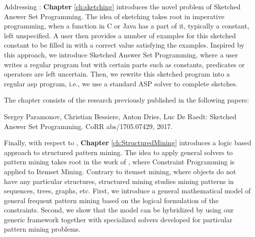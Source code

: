 Addressing \cthree:  \textbf{Chapter} \ref{ch:sketching} introduces the novel problem of
Sketched Answer Set Programming. The idea of sketching takes root in
imperative programming, when a function in C or Java has a part of it,
typically a constant, left unspecified. A user then provides a number
of examples for this sketched constant to be filled in with a
correct value satisfying the examples. Inspired by this approach, we
introduce Sketched Answer Set Programming, where a user writes a
regular program but with certain parts such as constants, predicates
or operators are left uncertain. Then, we rewrite this sketched
program into a regular \acrlong{asp} program, i.e., we use a standard ASP solver
to complete sketches.


The chapter consists of the research previously published in the following papers:
\begin{addmargin}[2em]{2em}
  Sergey Paramonov, Christian Bessiere, Anton Dries, Luc De Raedt:
  Sketched Answer Set Programming. CoRR abs/1705.07429, 2017.
\end{addmargin}






Finally, with respect to \cfour, \textbf{Chapter} \ref{ch:StructuredMining} introduces a logic
based approach to structured pattern mining. The idea to apply general
solvers to pattern mining takes root in the work of
\textcite{declrativeapproach}, where Constraint Programming is applied to
Itemset Mining. Contrary to itemset mining, where objects do not have
any particular structures, structured mining studies mining patterns
in sequences, trees, graphs, etc. First, we introduce a general
mathematical model of general frequent pattern mining based on the logical formulation of
the constraints. Second, we show that the model can be hybridized by
using our generic framework together with specialized solvers
developed for particular pattern mining problems.

